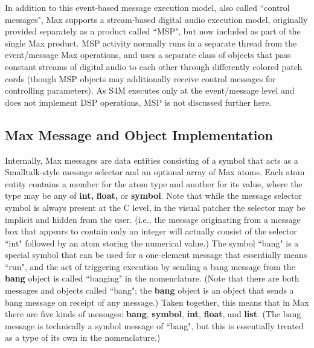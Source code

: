 \documentclass[acmsmall, anonymous, review]{acmart}
\begin{document}
In addition to this event-based message execution model, also called ``control messages", Max 
supports a stream-based digital 
audio execution model, originally provided separately as a product called ``MSP", but now included 
as part of the single Max product.
MSP activity normally runs in a separate thread from the event/message Max operations, and uses 
a separate class of objects that pass constant streams of digital audio to each other through differently 
colored patch cords (though MSP objects may additionally receive control messages for controlling parameters). As  
S4M executes only at the event/message level and does not implement DSP operations, MSP is not 
discussed further here. 


\subsection{Max Message and Object Implementation} 

Internally, Max messages are data entities consisting of a symbol that acts
as a Smalltalk-style message selector and an optional array of Max atoms. 
Each atom entity contains a member for the atom type and another for its value, 
where the type may be any of \textbf{int,} \textbf{float,} or \textbf{symbol}. 
Note that while the message selector symbol is always present at the C level,
in the visual patcher the selector may be implicit and hidden from the user. 
(i.e., the message originating from a message box that appears to contain only an integer
will actually consist of the selector ``int" followed by an atom storing the numerical value.)
The symbol ``bang" is a special symbol that can be used for a one-element message 
that essentially means ``run", and the act of triggering execution by sending a bang
message from the \textbf{bang} object is called ``banging" in the nomenclature.
(Note that there are both messages and objects called ``bang"; the \textbf{bang} 
object is an object that sends a bang message on receipt of any message.)
Taken together, this means that in Max there are five kinds of messages: 
\textbf{bang}, \textbf{symbol}, \textbf{int}, \textbf{float}, and \textbf{list}. 
\cite{Puckette2002}
(The bang message is technically a symbol message
of ``bang", but this is essentially treated as a type of its own in the nomenclature.) 
\end{document}
